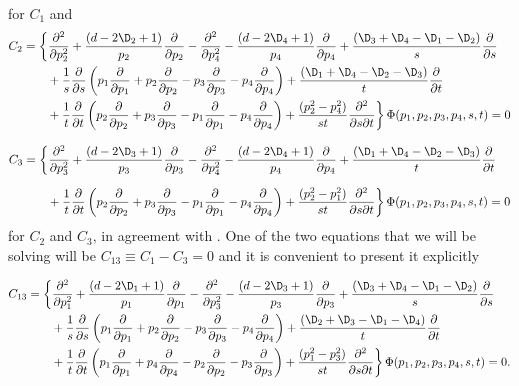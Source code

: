 \documentclass[a4paper,11pt,openright,twoside]{book}
\numberwithin{equation}{section}
\begin{document}
{\begin{align}
\end{align}
for $C_1$ and
\begin{align}
	C_2&=\bigg\{\frac{\partial^2}{\partial p_2^2}+\frac{(d-2\D_2+1)}{p_2}\frac{\partial}{\partial p_2}-\frac{\partial^2}{\partial p_4^2}-\frac{(d-2\D_4+1)}{p_4}\frac{\partial}{\partial p_4}+\frac{(\D_3+\D_4-\D_1-\D_2)}{s}\frac{\partial}{\partial s}\notag\\
	&\qquad+\frac{1}{s}\frac{\partial}{\partial s}\left(p_1\frac{\partial}{\partial p_1}+p_2\frac{\partial}{\partial p_2}-p_3\frac{\partial}{\partial p_3}-p_4\frac{\partial}{\partial p_4}\right)+\frac{(\D_1+\D_4-\D_2-\D_3)}{t}\frac{\partial}{\partial t}\notag\\
	&\qquad+\frac{1}{t}\frac{\partial}{\partial t}\left(p_2\frac{\partial}{\partial p_2}+p_3\frac{\partial}{\partial p_3}-p_1\frac{\partial}{\partial p_1}-p_4\frac{\partial}{\partial p_4}\right)+\frac{(p_2^2-p_4^2)}{st}\frac{\partial^2}{\partial s\partial t}\bigg\}\,\Phi(p_1,p_2,p_3,p_4,s,t)=0
	\label{C2}
\end{align}

\begin{align}
	C_3&=\bigg\{\frac{\partial^2}{\partial p_3^2}+\frac{(d-2\D_3+1)}{p_3}\frac{\partial}{\partial p_3}-\frac{\partial^2}{\partial p_4^2}-\frac{(d-2\D_4+1)}{p_4}\frac{\partial}{\partial p_4}+\frac{(\D_1+\D_4-\D_2-\D_3)}{t}\frac{\partial}{\partial t}\notag\\[1.5ex]
	&\qquad+\frac{1}{t}\frac{\partial}{\partial t}\left(p_2\frac{\partial}{\partial p_2}+p_3\frac{\partial}{\partial p_3}-p_1\frac{\partial}{\partial p_1}-p_4\frac{\partial}{\partial p_4}\right)+\frac{(p_2^2-p_1^2)}{st}\frac{\partial^2}{\partial s\partial t}\bigg\}\,\Phi(p_1,p_2,p_3,p_4,s,t)=0\label{C3}
\end{align}
for $C_2$ and $C_3$, in agreement with \cite{Arkani-Hamed:2018kmz}. One of the two equations that we will be solving will be  
$C_{13}\equiv C_1- C_3=0$ and it is convenient to present it explicitly

\begin{align}
	C_{13}&=\bigg\{\frac{\partial^2}{\partial p_1^2}+\frac{(d-2\D_1+1)}{p_1}\frac{\partial}{\partial p_1}-\frac{\partial^2}{\partial p_3^2}-\frac{(d-2\D_3+1)}{p_3}\frac{\partial}{\partial p_3}+\frac{(\D_3+\D_4-\D_1-\D_2)}{s}\frac{\partial}{\partial s}\notag\\
	&\qquad+\frac{1}{s}\frac{\partial}{\partial s}\left(p_1\frac{\partial}{\partial p_1}+p_2\frac{\partial}{\partial p_2}-p_3\frac{\partial}{\partial p_3}-p_4\frac{\partial}{\partial p_4}\right)+\frac{(\D_2+\D_3-\D_1-\D_4)}{t}\frac{\partial}{\partial t}\notag\\
	&\qquad+\frac{1}{t}\frac{\partial}{\partial t}\left(p_1\frac{\partial}{\partial p_1}+p_4\frac{\partial}{\partial p_4}-p_2\frac{\partial}{\partial p_2}-p_3\frac{\partial}{\partial p_3}\right)+\frac{(p_1^2-p_3^2)}{st}\frac{\partial^2}{\partial s\partial t}\bigg\}\,\Phi(p_1,p_2,p_3,p_4,s,t)=0.\label{Eq2}
\end{align}

}
\end{document}
